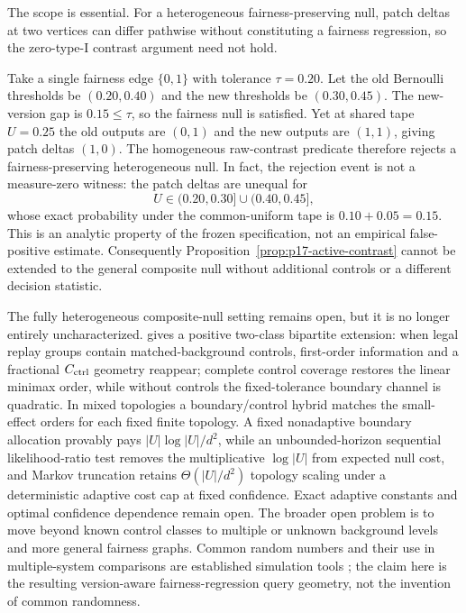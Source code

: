 The scope is essential.  For a heterogeneous fairness-preserving null, patch
deltas at two vertices can differ pathwise without constituting a fairness
regression, so the zero-type-I contrast argument need not hold.

\begin{remark}
\label{rem:p17-heterogeneous-scope}
Take a single fairness edge $\{0,1\}$ with tolerance $\tau=0.20$. Let the
old Bernoulli thresholds be $(0.20,0.40)$ and the new thresholds be
$(0.30,0.45)$. The new-version gap is $0.15\le\tau$, so the fairness null is
satisfied. Yet at shared tape $U=0.25$ the old outputs are $(0,1)$ and the new
outputs are $(1,1)$, giving patch deltas $(1,0)$. The homogeneous raw-contrast
predicate therefore rejects a fairness-preserving heterogeneous null.
In fact, the rejection event is not a measure-zero witness: the patch deltas
are unequal for
\[
U\in(0.20,0.30]\cup(0.40,0.45],
\]
whose exact probability under the common-uniform tape is $0.10+0.05=0.15$.
This is an analytic property of the frozen specification, not an empirical
false-positive estimate. Consequently Proposition~\ref{prop:p17-active-contrast} cannot be extended to
the general composite null without additional controls or a different decision
statistic.
\end{remark}

The fully heterogeneous composite-null setting remains open, but it is no
longer entirely uncharacterized.   gives a positive
two-class bipartite extension: when legal replay groups contain
matched-background controls, first-order information and a fractional
$C_{\rm ctrl}$ geometry reappear; complete control coverage restores the linear
minimax order, while without controls the fixed-tolerance boundary channel is
quadratic.  In mixed topologies a boundary/control hybrid matches the
small-effect orders for each fixed finite topology.  A fixed nonadaptive
boundary allocation provably pays $|U|\log |U|/d^2$, while an unbounded-horizon
sequential likelihood-ratio test removes the multiplicative $\log |U|$ from
expected null cost, and Markov truncation retains $\Theta(|U|/d^2)$ topology
scaling under a deterministic adaptive cost cap at fixed confidence.  Exact
adaptive constants and optimal confidence dependence remain open.  The broader
open problem is to move
beyond known control classes to multiple or unknown background levels and more
general fairness graphs.  Common random
numbers and their use in multiple-system
comparisons are established simulation tools
\cite{GlassermanYao1992,YangNelson1991}; the claim here is the resulting
version-aware fairness-regression query geometry, not the invention of common
randomness.

